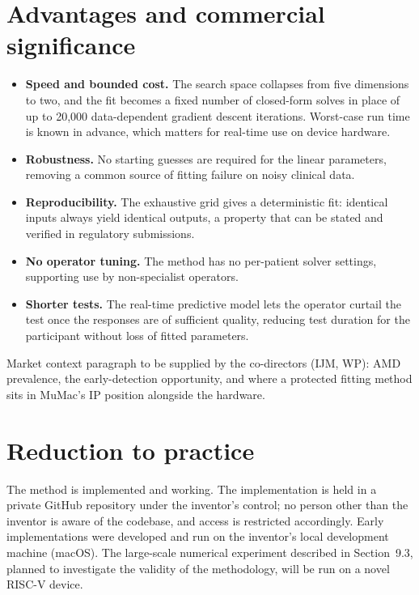 \documentclass[11pt,a4paper]{article}
\begin{document}
\section{Advantages and commercial significance}
\begin{itemize}[nosep]
\item \textbf{Speed and bounded cost.} The search space collapses from
  five dimensions to two, and the fit becomes a fixed number of
  closed-form solves in place of up to 20{,}000 data-dependent gradient
  descent iterations. Worst-case run time is known in advance, which
  matters for real-time use on device hardware.
\item \textbf{Robustness.} No starting guesses are required for the
  linear parameters, removing a common source of fitting failure on noisy
  clinical data.
\item \textbf{Reproducibility.} The exhaustive grid gives a deterministic
  fit: identical inputs always yield identical outputs, a property that
  can be stated and verified in regulatory submissions.
\item \textbf{No operator tuning.} The method has no per-patient solver
  settings, supporting use by non-specialist operators.
\item \textbf{Shorter tests.} The real-time predictive model lets the
  operator curtail the test once the responses are of sufficient quality,
  reducing test duration for the participant without loss of fitted
  parameters.
\end{itemize}

\begin{todo}
Market context paragraph to be supplied by the co-directors (IJM, WP):
AMD prevalence, the early-detection opportunity, and where a protected
fitting method sits in MuMac's IP position alongside the hardware.
\end{todo}

\section{Reduction to practice}
The method is implemented and working. The implementation is held in a
private GitHub repository under the inventor's control; no person other
than the inventor is aware of the codebase, and access is restricted
accordingly. Early implementations were developed and run on the
inventor's local development machine (macOS). The large-scale numerical
experiment described in Section~9.3, planned to investigate the validity
of the methodology, will be run on a novel RISC-V device.
\end{document}
